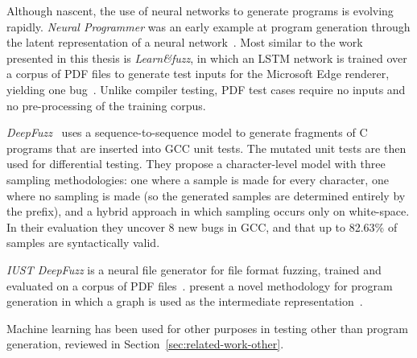 Although nascent, the use of neural networks to generate programs is evolving rapidly. \emph{Neural Programmer} was an early example at program generation through the latent representation of a neural network~\cite{Neelakantan2016}.
Most similar to the work presented in this thesis is \emph{Learn\&fuzz}, in which an LSTM network is trained over a corpus of PDF files to generate test inputs for the Microsoft Edge renderer, yielding one bug~\cite{Godefroid2017}. Unlike compiler testing, PDF test cases require no inputs and no pre-processing of the training corpus.

\emph{DeepFuzz}~\cite{Liu2019} uses a sequence-to-sequence model to generate fragments of C programs that are inserted into GCC unit tests. The mutated unit tests are then used for differential testing. They propose a character-level model with three sampling methodologies: one where a sample is made for every character, one where no sampling is made (so the generated samples are determined entirely by the prefix), and a hybrid approach in which sampling occurs only on white-space. In their evaluation they uncover 8 new bugs in GCC, and that up to 82.63\% of samples are syntactically valid.

\emph{IUST DeepFuzz} is a neural file generator for file format fuzzing, trained and evaluated on a corpus of PDF files~\cite{Nasrabadi2018}.
\citeauthor{Brockschmidt2018} present a novel methodology for program generation in which a graph is used as the intermediate representation~\cite{Brockschmidt2018}.

Machine learning has been used for other purposes in testing other than program generation, reviewed in Section~\ref{sec:related-work-other}.
